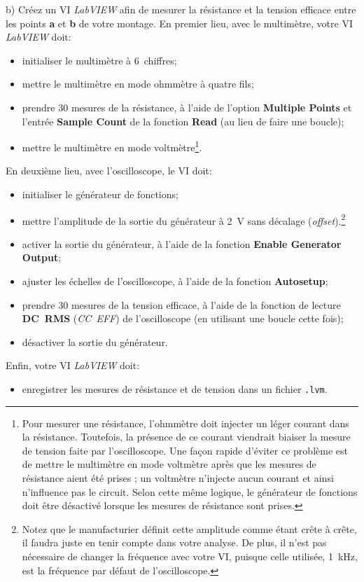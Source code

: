 \documentclass[canadien,12pt,oneside,letterpaper]{article}
\begin{document}
b) Créez un VI \textit{LabVIEW} afin de mesurer la résistance et la tension efficace entre les points \textbf{a} et \textbf{b} de votre montage. En premier lieu, avec le multimètre, votre VI \textit{LabVIEW} doit:
\begin{itemize}
\item initialiser le multimètre à 6\textonehalf~chiffres;
\item mettre le multimètre en mode ohmmètre à quatre fils;
\item prendre 30 mesures de la résistance, à l'aide de l'option \textbf{Multiple Points} et l'entrée \textbf{Sample Count} de la fonction \textbf{Read} (au lieu de faire une boucle);
\item mettre le multimètre en mode voltmètre\footnote{Pour mesurer une résistance, l'ohmmètre doit injecter un léger courant dans la résistance. Toutefois, la présence de ce courant viendrait biaiser la mesure de tension faite par l'oscilloscope. Une façon rapide d'éviter ce problème est de mettre le multimètre en mode voltmètre après que les mesures de résistance aient été prises ; un voltmètre n'injecte aucun courant et ainsi n'influence pas le circuit. Selon cette même logique, le générateur de fonctions doit être désactivé lorsque les mesures de résistance sont prises.}.
\end{itemize}
En deuxième lieu, avec l'oscilloscope, le VI doit:
\begin{itemize}
\item initialiser le générateur de fonctions;
\item mettre l'amplitude de la sortie du générateur à 2~V sans décalage (\textit{offset}).\footnote{Notez que le manufacturier définit cette amplitude comme étant crête à crête, il faudra juste en tenir compte dans votre analyse. De plus, il n'est pas nécessaire de changer la fréquence avec votre VI, puisque celle utilisée, 1~kHz, est la fréquence par défaut de l'oscilloscope.}
\item activer la sortie du générateur, à l'aide de la fonction \textbf{Enable Generator Output};
\item ajuster les échelles de l'oscilloscope, à l'aide de la fonction \textbf{Autosetup};
\item prendre 30 mesures de la tension efficace, à l'aide de la fonction de lecture \textbf{DC~RMS} (\textit{CC~EFF}) de l'oscilloscope (en utilisant une boucle cette fois);
\item désactiver la sortie du générateur.
\end{itemize}
Enfin, votre VI \textit{LabVIEW} doit:
\begin{itemize}
\item enregistrer les mesures de résistance et de tension dans un fichier \texttt{.lvm}.
\end{itemize}
\end{document}

